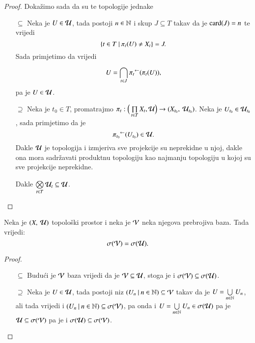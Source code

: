 \begin{proof}
    Doka\v zimo sada da su te topologije jednake
    \begin{enumerate}
        \item[$\subseteq$] Neka je $U \in \mathcal{U}$, tada postoji $n \in \mathbb{N}$ i skup $J \subseteq T$ takav da je $\textnormal{card}({J}) = n$ te vrijedi
        \begin{equation*}
            \{{t \in T} \: | \: {\pi_t(U) \neq X_t}\} = J.
        \end{equation*}
        Sada primjetimo da vrijedi
        \begin{equation*}
            U = \bigcap\limits_{t \in J}^{} {\pi_t}^{\leftarrow} (\pi_t (U)),
        \end{equation*}
        pa je $U \in \mathcal{U}$.
        \item[$\supseteq$]
        Neka je $t_0 \in T$, promatrajmo $\pi_t : \Big( \prod\limits_{t \in T}^{} X_t, \mathcal{U} \Big) \to ({X_{t_0}}, \: {\mathcal{U}_{t_0}})$.
        Neka je $U_{t_0} \in \mathcal{U}_{t_0}$, sada primjetimo da je
        \begin{equation*}
            {\pi_{t_0}}^{\leftarrow} (U_{t_0}) \in \mathcal{U}.
        \end{equation*}
        Dakle $\mathcal{U}$ je topologija i izmjeriva sve projekcije su neprekidne u njoj, dakle ona mora sadr\v zavati produktnu topologiju kao najmanju topologiju u kojoj su sve projekcije neprekidne.

        Dakle $\bigotimes\limits_{t \in T}^{} \mathcal{U}_t \subseteq \mathcal{U}$.
    \end{enumerate}
\end{proof}

\begin{tm}  \label{tm:4.0-3}
    Neka je $({X}, \: {\mathcal{U}})$ topolo\v ski prostor i neka je $\mathcal{V}$ neka njegova prebrojiva baza.
    Tada vrijedi:
    \begin{equation*}
        \sigma({\mathcal{V}}) = \sigma({\mathcal{U}}).
    \end{equation*}
\end{tm}

\begin{proof}
    \quad
    \begin{enumerate}
        \item[$\subseteq$] Budu\' ci je $\mathcal{V}$ baza vrijedi da je $\mathcal{V} \subseteq \mathcal{U}$, stoga je i $\sigma({\mathcal{V}}) \subseteq \sigma({\mathcal{U}})$.
        \item[$\supseteq$] Neka je $U \in \mathcal{U}$, tada postoji niz $({U_n} \: | \: {n \in \mathbb{N}}) \subseteq \mathcal{V}$ takav da je $U = \bigcup\limits_{n \in \mathbb{N}}^{} U_n$, ali tada vrijedi i $({U_n} \: | \: {n \in \mathbb{N}}) \subseteq \sigma({\mathcal{V}})$, pa onda i $U = \bigcup\limits_{n \in \mathbb{N}}^{} U_n \in \sigma({\mathcal{U}})$ pa je $\mathcal{U} \subseteq \sigma({\mathcal{V}})$ pa je i $\sigma({\mathcal{U}}) \subseteq \sigma({\mathcal{V}})$.  
    \end{enumerate}
\end{proof}

